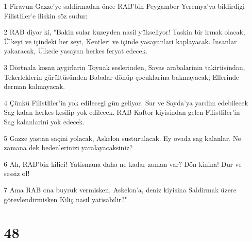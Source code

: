 \par 1 Firavun Gazze'ye saldirmadan önce RAB'bin Peygamber Yeremya'ya bildirdigi Filistliler'e iliskin söz sudur:
\par 2 RAB diyor ki, "Bakin sular kuzeyden nasil yükseliyor! Taskin bir irmak olacak, Ülkeyi ve içindeki her seyi, Kentleri ve içinde yasayanlari kaplayacak. Insanlar yakaracak, Ülkede yasayan herkes feryat edecek.
\par 3 Dörtnala kosan aygirlarin Toynak seslerinden, Savas arabalarinin takirtisindan, Tekerleklerin gürültüsünden Babalar dönüp çocuklarina bakmayacak; Ellerinde derman kalmayacak.
\par 4 Çünkü Filistliler'in yok edilecegi gün geliyor. Sur ve Sayda'ya yardim edebilecek Sag kalan herkes kesilip yok edilecek. RAB Kaftor kiyisindan gelen Filistliler'in Sag kalanlarini yok edecek.
\par 5 Gazze yastan saçini yolacak, Askelon susturulacak. Ey ovada sag kalanlar, Ne zamana dek bedenlerinizi yaralayacaksiniz?
\par 6 Ah, RAB'bin kilici! Yatismana daha ne kadar zaman var? Dön kinina! Dur ve sessiz ol!
\par 7 Ama RAB ona buyruk vermisken, Askelon'a, deniz kiyisina Saldirmak üzere görevlendirmisken Kiliç nasil yatisabilir?"

\chapter{48}

